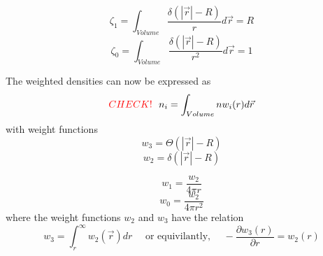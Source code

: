 \documentclass[double,12pt]{beavtex}
\begin{document}
\begin{equation}{\zeta_{1}=\int_{Volume}{\frac{\delta(|\vec{r}|-R)}{r}d{\vec{r}}} = R}\end{equation}
\begin{equation}{\zeta_{0}=\int_{Volume}{\frac{\delta(|\vec{r}|-R)}{r^2}d{\vec{r}}} = 1}\end{equation}

The weighted densities can now be expressed as
\begin{equation}{\color{red} CHECK!~~\color{black}n_{i}=\int_{Volume}{nw_{i}(r)}d{\vec{r}}}\end{equation} 
with weight functions
\begin{equation}{w_{3}=\Theta(|\vec{r}|-R)}\end{equation}
\begin{equation}{w_{2}=\delta(|\vec{r}|-R)}\end{equation}

\begin{equation}{w_{1}=\frac{w_{2}}{4\pi{r}}}\end{equation}
\begin{equation}{w_{0}=\frac{w_{2}}{4\pi{r}^2}}\end{equation}
where the weight functions $w_{2}$ and $w_{3}$ have the relation
\begin{equation}\label{w2_w3_relation}{w_{3}=\int_{r}^{\infty}{w_{2}(\vec{r})dr}\mbox{~~~~or equivilantly,~~~~}-\frac{\partial{w_3(r)}}{\partial{r}}=w_2(r)}\end{equation}
\end{document}
